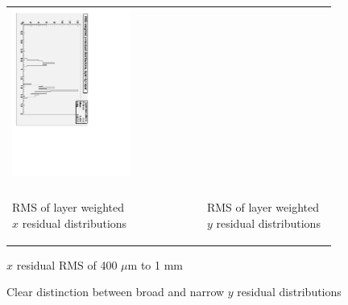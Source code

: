 \documentclass[compress]{beamer}
\begin{document}
\begin{frame}
\begin{center}
\begin{tabular}{p{0.4\linewidth} c p{0.4\linewidth}}
\begin{minipage}{\linewidth}
    \includegraphics[height=\linewidth, angle=90]{rms_of_layer_yresid_distributions.pdf}
  \end{minipage} \\
  & & \\
  \begin{minipage}{\linewidth}
    \begin{center}
      RMS of layer weighted $x$ residual distributions
    \end{center}
  \end{minipage} & &
  \begin{minipage}{\linewidth}
    \begin{center}
      RMS of layer weighted $y$ residual distributions
    \end{center}
  \end{minipage} \\
\end{tabular}
\end{center}

\vfill $x$ residual RMS of 400 $\mu$m to 1 mm

\vfill Clear distinction between broad and narrow $y$ residual distributions
\end{frame}
\end{document}
